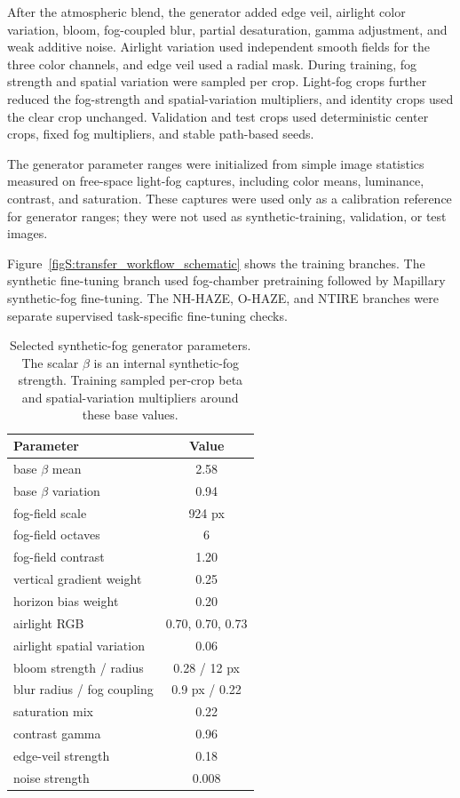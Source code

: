 \documentclass[9pt]{osa-supplemental-document}
\begin{document}
After the atmospheric blend, the generator added edge veil, airlight color variation, bloom, fog-coupled blur, partial desaturation, gamma adjustment, and weak additive noise. Airlight variation used independent smooth fields for the three color channels, and edge veil used a radial mask. During training, fog strength and spatial variation were sampled per crop. Light-fog crops further reduced the fog-strength and spatial-variation multipliers, and identity crops used the clear crop unchanged. Validation and test crops used deterministic center crops, fixed fog multipliers, and stable path-based seeds.

The generator parameter ranges were initialized from simple image statistics measured on free-space light-fog captures, including color means, luminance, contrast, and saturation. These captures were used only as a calibration reference for generator ranges; they were not used as synthetic-training, validation, or test images.

Figure~\ref{figS:transfer_workflow_schematic} shows the training branches. The synthetic fine-tuning branch used fog-chamber pretraining followed by Mapillary synthetic-fog fine-tuning. The NH-HAZE, O-HAZE, and NTIRE branches were separate supervised task-specific fine-tuning checks.

\begin{table}[htbp]
\centering
\small
\caption{Selected synthetic-fog generator parameters. The scalar $\beta$ is an internal synthetic-fog strength. Training sampled per-crop beta and spatial-variation multipliers around these base values.}
\label{tabS:spatial_synth_params}
\begin{tabular}{lc}
\toprule
\textbf{Parameter} & \textbf{Value} \\
\midrule
base $\beta$ mean & 2.58 \\
base $\beta$ variation & 0.94 \\
fog-field scale & 924 px \\
fog-field octaves & 6 \\
fog-field contrast & 1.20 \\
vertical gradient weight & 0.25 \\
horizon bias weight & 0.20 \\
airlight RGB & 0.70, 0.70, 0.73 \\
airlight spatial variation & 0.06 \\
bloom strength / radius & 0.28 / 12 px \\
blur radius / fog coupling & 0.9 px / 0.22 \\
saturation mix & 0.22 \\
contrast gamma & 0.96 \\
edge-veil strength & 0.18 \\
noise strength & 0.008 \\
\bottomrule
\end{tabular}
\end{table}
\end{document}

